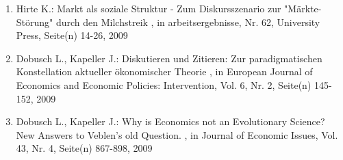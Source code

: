 \begin{enumerate}[leftmargin=*, labelsep=0.5cm]
	 \item Hirte K.:  Markt als soziale Struktur - Zum Diskursszenario zur "Märkte-Störung" durch den Milchstreik  , in arbeitsergebnisse, Nr. 62, University Press, Seite(n) 14-26, 2009
	 \item Dobusch L., Kapeller J.:  Diskutieren und Zitieren: Zur paradigmatischen Konstellation aktueller ökonomischer Theorie  , in European Journal of Economics and Economic Policies: Intervention, Vol. 6, Nr. 2, Seite(n) 145-152, 2009
	 \item Dobusch L., Kapeller J.:  Why is Economics not an Evolutionary Science? New Answers to Veblen's old Question.  , in Journal of Economic Issues, Vol. 43, Nr. 4, Seite(n) 867-898, 2009
\end{enumerate}